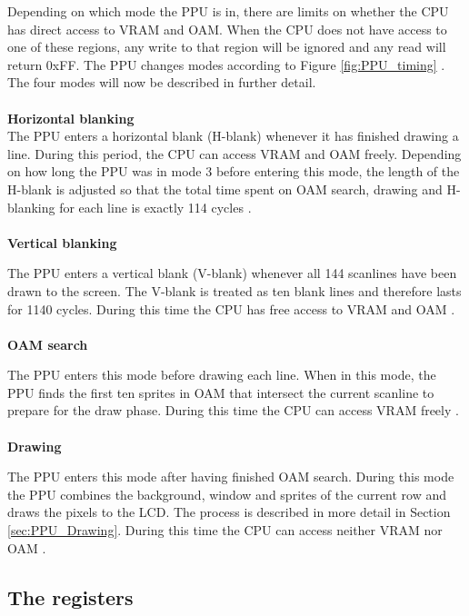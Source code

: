 Depending on which mode the PPU is in, there are limits on whether the CPU has direct access to VRAM and OAM. When the CPU does not have access to one of these regions, any write to that region will be ignored and any read will return 0xFF. The PPU changes modes according to Figure \ref{fig:PPU_timing} \cite{pandocsVideo}. The four modes will now be described in further detail.\\
\\
\textbf{Horizontal blanking}
\\
The PPU enters a horizontal blank (H-blank) whenever it has finished drawing a line. During this period, the CPU can access VRAM and OAM freely. Depending on how long the PPU was in mode 3 before entering this mode, the length of the H-blank is adjusted so that the total time spent on OAM search, drawing and H-blanking for each line is exactly 114 cycles \cite{pandocsVideo}.\\
\\
\textbf{Vertical blanking}

The PPU enters a vertical blank (V-blank) whenever all 144 scanlines have been drawn to the screen. The V-blank is treated as ten blank lines and therefore lasts for 1140 cycles. During this time the CPU has free access to VRAM and OAM \cite{pandocsVideo}.\\
\\
\textbf{OAM search}

The PPU enters this mode before drawing each line. When in this mode, the PPU finds the first ten sprites in OAM that intersect the current scanline to prepare for the draw phase. During this time the CPU can access VRAM freely \cite{pandocsVideo}. \\
\\
\textbf{Drawing}

The PPU enters this mode after having finished OAM search. During this mode the PPU combines the background, window and sprites of the current row and draws the pixels to the LCD. The process is described in more detail in Section \ref{sec:PPU_Drawing}. During this time the CPU can access neither VRAM nor OAM \cite{pandocsVideo}. 

\subsection{The registers}
\label{sec:PPU_Registers}

